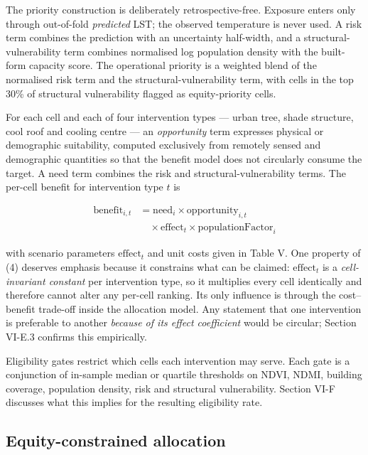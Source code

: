 \documentclass[conference]{IEEEtran}
\begin{document}
The priority construction is deliberately retrospective-free. Exposure enters only through
out-of-fold \emph{predicted} LST; the observed temperature is never used. A risk term combines the
prediction with an uncertainty half-width, and a structural-vulnerability term combines normalised
log population density with the built-form capacity score. The operational priority is a weighted
blend of the normalised risk term and the structural-vulnerability term, with cells in the top 30\% of
structural vulnerability flagged as equity-priority cells.

For each cell and each of four intervention types --- urban tree, shade structure, cool roof and
cooling centre --- an \emph{opportunity} term expresses physical or demographic suitability, computed
exclusively from remotely sensed and demographic quantities so that the benefit model does not
circularly consume the target. A need term combines the risk and structural-vulnerability terms. The
per-cell benefit for intervention type \(t\) is

\[\begin{aligned}\mathrm{benefit}_{i,t} &= \mathrm{need}_i \times \mathrm{opportunity}_{i,t} \\ &\quad \times \mathrm{effect}_t \times \mathrm{populationFactor}_i \end{aligned} \tag{4}\]

with scenario parameters \(\mathrm{effect}_t\) and unit costs given in Table V. One property of (4)
deserves emphasis because it constrains what can be claimed: \(\mathrm{effect}_t\) is a
\emph{cell-invariant constant} per intervention type, so it multiplies every cell identically and
therefore cannot alter any per-cell ranking. Its only influence is through the cost--benefit
trade-off inside the allocation model. Any statement that one intervention is preferable to another
\emph{because of its effect coefficient} would be circular; Section VI-E.3 confirms this empirically.

Eligibility gates restrict which cells each intervention may serve. Each gate is a conjunction of
in-sample median or quartile thresholds on NDVI, NDMI, building coverage, population density, risk
and structural vulnerability. Section VI-F discusses what this implies for the resulting eligibility
rate.

\subsection{Equity-constrained allocation}\label{h.-equity-constrained-allocation}
\end{document}
